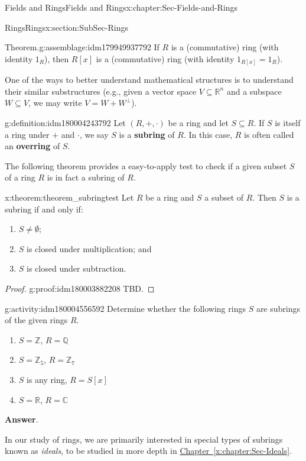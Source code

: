 \documentclass[oneside,10pt,]{book}
\newcommand{\blocktitlefont}{\relax}
\newcommand{\xreffont}{\relax}
\newcommand{\terminology}[1]{\textbf{#1}}
\numberwithin{equation}{section}
\def\C{{\mathbb C}}
\def\Z{{\mathbb Z}}
\def\Q{{\mathbb Q}}
\def\R{{\mathbb R}}
\begin{document}
\begin{chapterptx}{Fields and Rings}{}{Fields and Rings}{}{}{x:chapter:Sec-Fields-and-Rings}
\begin{sectionptx}{Rings}{}{Rings}{}{}{x:section:SubSec-Rings}
\begin{assemblage}{Theorem.}{g:assemblage:idm179949937792}
If \(R\) is a (commutative) ring (with identity \(1_R\)), then \(R[x]\) is a (commutative) ring (with identity \(1_{R[x]} = 1_R\)).%
\end{assemblage}
One of the ways to better understand mathematical structures is to understand their similar substructures (e.g., given a vector space \(V\subseteq \R^n\) and a subspace \(W\subseteq V\), we may write \(V = W + W^\perp\)). %
\begin{definition}{}{g:definition:idm180004243792}%
%
%
Let \((R,+,\cdot)\) be a ring and let \(S\subseteq R\). If \(S\) is itself a ring under \(+\) and \(\cdot\), we say \(S\) is a \terminology{subring} of \(R\). In this case, \(R\) is often called an \terminology{overring} of \(S\).%
\end{definition}
The following theorem provides a easy-to-apply test to check if a given subset \(S\) of a ring \(R\) is in fact a subring of \(R\).%
\begin{theorem}{}{}{x:theorem:theorem_subringtest}%
%
Let \(R\) be a ring and \(S\) a subset of \(R\). Then \(S\) is a subring if and only if:%
\begin{enumerate}
\item{}\(S\ne \emptyset\);%
\item{}\(S\) is closed under multiplication; and%
\item{}\(S\) is closed under subtraction.%
\end{enumerate}
%
\end{theorem}
\begin{proof}{}{g:proof:idm180003882208}
TBD.%
\end{proof}
\begin{activity}{}{g:activity:idm180004556592}%
Determine whether the following rings \(S\) are subrings of the given rings \(R\).%
\begin{enumerate}
\item{}\(S = \Z\), \(R = \Q\)%
\item{}\(S = \Z_{5}\), \(R = \Z_{7}\)%
\item{}\(S\) is any ring, \(R = S[x]\)%
\item{}\(S = \R\), \(R = \C\)%
\end{enumerate}
%
\par\smallskip%
\noindent\textbf{\blocktitlefont Answer}.\hypertarget{g:answer:idm180004588048}{}\quad{}\end{activity}
In our study of rings, we are primarily interested in special types of subrings known as \emph{ideals}, to be studied in more depth in \hyperref[x:chapter:Sec-Ideals]{Chapter~{\xreffont\ref{x:chapter:Sec-Ideals}}}.%

\end{sectionptx}
\end{chapterptx}
\end{document}
